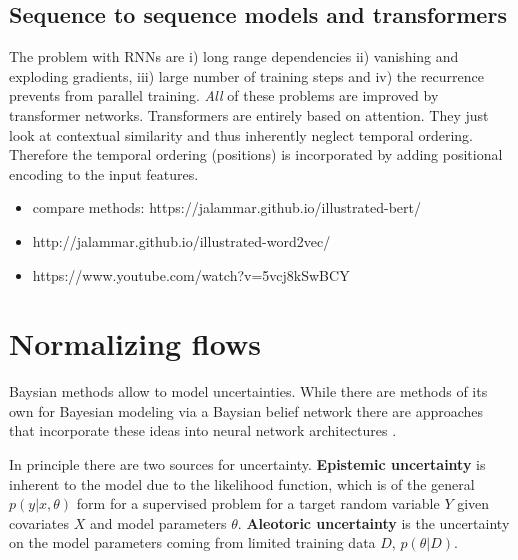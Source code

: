 \documentclass[12pt,a4paper]{article}
\begin{document}
\subsection{Sequence to sequence models and transformers}
The problem with RNNs are i) long range dependencies ii) vanishing and exploding gradients, iii) large number of training steps and iv) the recurrence prevents from parallel training. \textit{All} of these problems are improved by transformer networks. 
Transformers are entirely based on attention. They just look at contextual similarity and thus inherently neglect temporal ordering. Therefore the temporal ordering (positions) is incorporated by adding positional encoding to the input features.


\begin{itemize}
	 \item compare methods: https://jalammar.github.io/illustrated-bert/
	 \item http://jalammar.github.io/illustrated-word2vec/
	 \item https://www.youtube.com/watch?v=5vcj8kSwBCY
	 
\end{itemize}

\section{Normalizing flows}
Baysian methods allow to model uncertainties. While there are methods of its own for Bayesian modeling via a Baysian belief network there are approaches that incorporate these ideas into neural network architectures \cite{bayesion_networks_tutoral_2020}. 

In principle there are two sources for uncertainty. \textbf{Epistemic uncertainty} is inherent to the model due to the likelihood function, which is of the general $p(y  | x, \theta)$ form for a supervised problem for a target random variable $Y$ given covariates $X$ and model parameters $\theta$.  \textbf{Aleotoric uncertainty} is the uncertainty on the model parameters coming from limited training data $D$, $p(\theta | D)$. 
\end{document}
